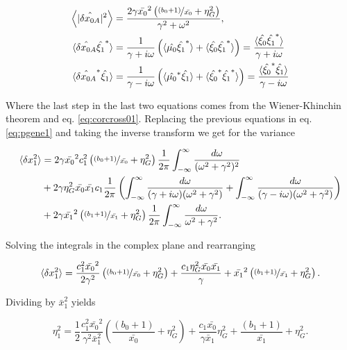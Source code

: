 \begin{align*}
\left\langle|\hat{\delta x_{0A}}|^2\right\rangle &= \frac{2\gamma\bar{x_0}^2\left(\nicefrac{(b_0+1)}{\bar{x_0}}+ \eta_G^2\right)}{\gamma^2+\omega^2},\\
\langle\hat{\delta x_{0A}}\hat{\xi_1}^*\rangle &= \frac{1}{\gamma+i\omega}\left(\langle\hat{\mu_0}\hat{\xi_1}^*\rangle + \langle\hat{\xi_0}\hat{\xi_1}^*\rangle \right) = \frac{\langle\hat{\xi_0}\hat{\xi_1}^*\rangle}{\gamma+i\omega}\\
\langle\hat{\delta x_{0A}}^*\hat{\xi_1}\rangle &= \frac{1}{\gamma-i\omega}\left(\langle\hat{\mu_0}^*\hat{\xi_1}\rangle + \langle\hat{\xi_0}^*\hat{\xi_1}^*\rangle \right) = \frac{\langle\hat{\xi_0}^*\hat{\xi_1}\rangle}{\gamma-i\omega}
\end{align*}

Where the last step in the last two equations comes from the Wiener-Khinchin theorem and eq. \eqref{eq:corcross01}. Replacing the previous equations in eq. \eqref{eq:pgene1} and taking the inverse transform we get for the variance

\begin{equation*}
  \begin{split}
    \langle \delta x_1^2\rangle &= 2\gamma\bar{x_0}^2c_1^2\left(\nicefrac{(b_0+1)}{\bar{x_0}}+ \eta_G^2\right)\frac{1}{2\pi}\int_{-\infty}^{\infty}\frac{d\omega}{(\omega^2+\gamma^2)^2}\\
    &+2\gamma\eta_G^2\bar{x_0}\bar{x_1}c_1\frac{1}{2\pi}\left(\int_{-\infty}^{\infty}\frac{d\omega}{(\gamma + i\omega)(\omega^2+\gamma^2)} + \int_{-\infty}^{\infty}\frac{d\omega}{(\gamma - i\omega)(\omega^2+\gamma^2)}\right)\\
    &+2\gamma\bar{x_1}^2 \left(\nicefrac{(b_1+1)}{\bar{x_1}}+\eta_G^2\right)\frac{1}{2\pi}\int_{-\infty}^{\infty}\frac{d\omega}{\omega^2+\gamma^2}.
  \end{split}
\end{equation*} 

Solving the integrals in the complex plane and rearranging

\begin{equation*}
  \langle \delta x_1^2\rangle = \frac{c_1^2\bar{x_0}^2}{2\gamma^2}\left(\nicefrac{(b_0+1)}{\bar{x_0}}+ \eta_G^2\right) + \frac{c_1\eta_G^2\bar{x_0}\bar{x_1}}{\gamma} + \bar{x_1}^2\left(\nicefrac{(b_1+1)}{\bar{x_1}}+\eta_G^2\right).
\end{equation*}

Dividing by $\bar{x}_1^2$ yields

\begin{equation}
  \label{eq:lan-eta1_alm}
  \eta_1^2 = \frac{1}{2}\frac{c_1^2\bar{x_0}^2}{\gamma^2\bar{x}_1^2}\left(\frac{(b_0+1)}{\bar{x_0}}+ \eta_G^2\right) + \frac{c_1\bar{x_0}}{\gamma \bar{x}_1}\eta_G^2 + \frac{(b_1+1)}{\bar{x_1}}+\eta_G^2.
\end{equation}


